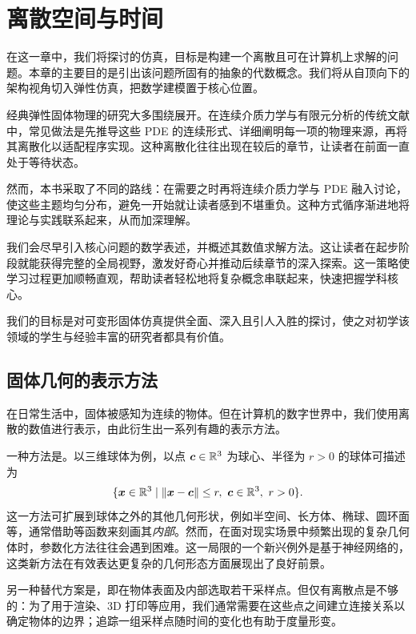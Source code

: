 \chapter{离散空间与时间}
\label{ch:discrete-space-and-time}

在这一章中，我们将探讨的仿真，目标是构建一个离散且可在计算机上求解的问题。本章的主要目的是引出该问题所固有的抽象的代数概念。我们将从自顶向下的架构视角切入弹性仿真，把数学建模置于核心位置。

经典弹性固体物理的研究大多围绕展开。在连续介质力学与有限元分析的传统文献中，常见做法是先推导这些 PDE 的连续形式、详细阐明每一项的物理来源，再将其离散化以适配程序实现。这种离散化往往出现在较后的章节，让读者在前面一直处于等待状态。

然而，本书采取了不同的路线：在需要之时再将连续介质力学与 PDE 融入讨论，使这些主题均匀分布，避免一开始就让读者感到不堪重负。这种方式循序渐进地将理论与实践联系起来，从而加深理解。

我们会尽早引入核心问题的数学表述，并概述其数值求解方法。这让读者在起步阶段就能获得完整的全局视野，激发好奇心并推动后续章节的深入探索。这一策略使学习过程更加顺畅直观，帮助读者轻松地将复杂概念串联起来，快速把握学科核心。

我们的目标是对可变形固体仿真提供全面、深入且引人入胜的探讨，使之对初学该领域的学生与经验丰富的研究者都具有价值。

\section{固体几何的表示方法}
\label{sec:solid-geometry}

在日常生活中，固体被感知为连续的物体。但在计算机的数字世界中，我们使用离散的数值进行表示，由此衍生出一系列有趣的表示方法。

一种方法是。以三维球体为例，以点 $\boldsymbol{c}\in\mathbb{R}^3$ 为球心、半径为 $r>0$ 的球体可描述为
\[
  \{\boldsymbol{x} \in \mathbb{R}^{3} \mid \lVert\boldsymbol{x} - \boldsymbol{c}\rVert \le r,\ \boldsymbol{c} \in \mathbb{R}^{3},\ r > 0\}.
\]
这一方法可扩展到球体之外的其他几何形状，例如半空间、长方体、椭球、圆环面等，通常借助等函数来刻画其\emph{内部}。然而，在面对现实场景中频繁出现的复杂几何体时，参数化方法往往会遇到困难。这一局限的一个新兴例外是基于神经网络的，这类新方法在有效表达更复杂的几何形态方面展现出了良好前景。

另一种替代方案是，即在物体表面及内部选取若干采样点。但仅有离散点是不够的：为了用于渲染、3D 打印等应用，我们通常需要在这些点之间建立连接关系以确定物体的边界；追踪一组采样点随时间的变化也有助于度量形变。


